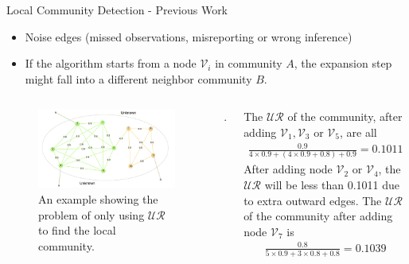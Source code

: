 \documentclass[9pt]{beamer}
\begin{document}
\begin{frame}{Local Community Detection - Previous Work}
\small
\begin{itemize}
\item Noise edges (missed observations, misreporting or wrong inference)
\item If the algorithm starts from a node $\mathcal{V}_i$ in community $A$, the expansion step might fall into a different neighbor community $B$.
\end{itemize}

\begin{columns}[T,onlytextwidth]
      \begin{figure}
      \centering
      \includegraphics[scale = 0.075]{toy_example.jpeg}
      \caption{An example showing the problem of only using $\mathcal{UR}$ to find the local community.}
      \label{problem_example}
      \end{figure}

    .
    
     The $\mathcal{UR}$ of the community, after adding $\mathcal{V}_1, \mathcal{V}_3$ or $\mathcal{V}_5$, are all 
\begin{align*}
\frac{0.9}{4\times0.9+(4\times0.9+0.8)+0.9}=0.1011
\end{align*}
\newline
After adding node $\mathcal{V}_2$ or $\mathcal{V}_4$, the $\mathcal{UR}$ will be less than 0.1011 due to extra outward edges. The $\mathcal{UR}$ of the community after adding node $\mathcal{V}_7$ is 
\begin{align*}
\frac{0.8}{5\times0.9+3\times0.8+0.8}=0.1039
\end{align*}
    
  \end{columns}

\end{frame}
\end{document}
